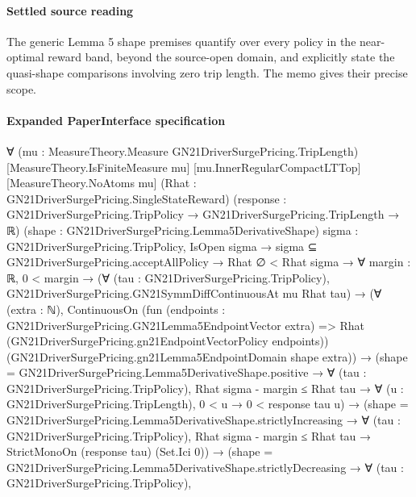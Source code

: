 \documentclass[10pt]{article}
\begin{document}
\paragraph{Settled source reading}
\begin{sloppypar}
The generic Lemma 5 shape premises quantify over every policy in the near-\allowbreak{}optimal reward band, beyond the source-\allowbreak{}open domain, and explicitly state the quasi-\allowbreak{}shape comparisons involving zero trip length.\allowbreak{} The memo gives their precise scope.\allowbreak{}
\end{sloppypar}

\paragraph{Expanded PaperInterface specification}
\begin{ReviewVerbatim}
∀ (mu : MeasureTheory.Measure GN21DriverSurgePricing.TripLength) [MeasureTheory.IsFiniteMeasure mu]
  [mu.InnerRegularCompactLTTop] [MeasureTheory.NoAtoms mu] (Rhat : GN21DriverSurgePricing.SingleStateReward)
  (response : GN21DriverSurgePricing.TripPolicy → GN21DriverSurgePricing.TripLength → ℝ)
  (shape : GN21DriverSurgePricing.Lemma5DerivativeShape) {sigma : GN21DriverSurgePricing.TripPolicy},
  IsOpen sigma →
    sigma ⊆ GN21DriverSurgePricing.acceptAllPolicy →
      Rhat ∅ < Rhat sigma →
        ∀ {margin : ℝ},
          0 < margin →
            (∀ (tau : GN21DriverSurgePricing.TripPolicy), GN21DriverSurgePricing.GN21SymmDiffContinuousAt mu Rhat tau) →
              (∀ (extra : ℕ),
                  ContinuousOn
                    (fun (endpoints : GN21DriverSurgePricing.GN21Lemma5EndpointVector extra) =>
                      Rhat (GN21DriverSurgePricing.gn21EndpointVectorPolicy endpoints))
                    (GN21DriverSurgePricing.gn21Lemma5EndpointDomain shape extra)) →
                (shape = GN21DriverSurgePricing.Lemma5DerivativeShape.positive →
                    ∀ (tau : GN21DriverSurgePricing.TripPolicy),
                      Rhat sigma - margin ≤ Rhat tau →
                        ∀ (u : GN21DriverSurgePricing.TripLength), 0 < u → 0 < response tau u) →
                  (shape = GN21DriverSurgePricing.Lemma5DerivativeShape.strictlyIncreasing →
                      ∀ (tau : GN21DriverSurgePricing.TripPolicy),
                        Rhat sigma - margin ≤ Rhat tau → StrictMonoOn (response tau) (Set.Ici 0)) →
                    (shape = GN21DriverSurgePricing.Lemma5DerivativeShape.strictlyDecreasing →
                        ∀ (tau : GN21DriverSurgePricing.TripPolicy),

\end{ReviewVerbatim}
\end{document}

